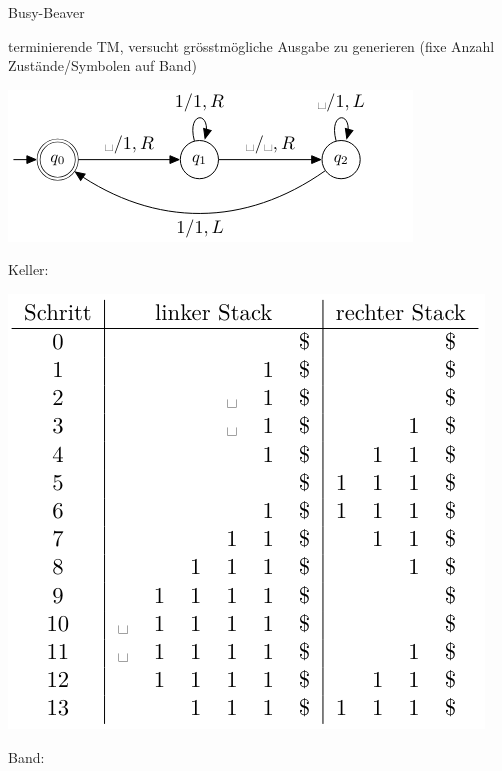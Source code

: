 \begin{example2}{Busy-Beaver} 
    
    \begin{minipage}{0.4\linewidth}
    terminierende TM, versucht grösstmögliche Ausgabe zu generieren (fixe Anzahl Zustände/Symbolen auf Band)
    \end{minipage}
    \begin{minipage}{0.6\linewidth}
    \includegraphics[width=1\linewidth]{images/busybeaver.png}
    \end{minipage}

    \vspace{2mm}

    \begin{minipage}{0.6\linewidth}
        Keller:

        \includegraphics[width=1\linewidth]{images/bbkeller.png}
    \end{minipage}
    \begin{minipage}{0.25\linewidth}
        Band:
        

\end{minipage}
\end{example2}
